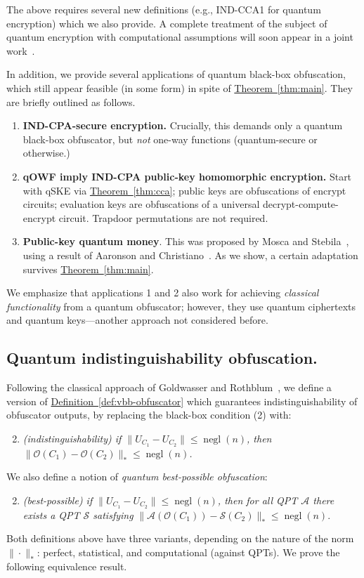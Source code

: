 \documentclass[11pt]{amsart}
\numberwithin{equation}{section}
\newcommand{\opn}{\operatorname}
\newcommand{\expref}[2]{\texorpdfstring{\hyperref[#2]{#1~\ref{#2}}}{#1~\ref{#2}}}
\newcommand{\negl}{\opn{negl}}
\begin{document}
\noindent The above requires several new definitions (e.g., IND-CCA1 for quantum encryption) which we also provide. A complete treatment of the subject of quantum encryption with computational assumptions will soon appear in a joint work~\cite{ABFGSS15}.

In addition, we provide several applications of quantum black-box obfuscation, which still appear feasible (in some form) in spite of \expref{Theorem}{thm:main}. They are briefly outlined as follows.
\begin{enumerate}
\item \textbf{IND-CPA-secure encryption.} Crucially, this demands only a quantum black-box obfuscator, but \emph{not} one-way functions (quantum-secure or otherwise.)
\item \textbf{qOWF imply IND-CPA public-key homomorphic encryption.} Start with qSKE via \expref{Theorem}{thm:cca}; public keys are obfuscations of encrypt circuits; evaluation keys are obfuscations of a universal decrypt-compute-encrypt circuit. Trapdoor permutations are not required.
\item \textbf{Public-key quantum money}. This was proposed by Mosca and Stebila~\cite{MS10}, using a result of Aaronson and Christiano~\cite{Aar09, AC12}. As we show, a certain adaptation survives \expref{Theorem}{thm:main}.
\end{enumerate}
\noindent We emphasize that applications 1 and 2 also work for achieving \emph{classical functionality} from a quantum obfuscator; however, they use quantum ciphertexts and quantum keys---another approach not considered before.

\subsection{Quantum indistinguishability obfuscation.}

Following the classical approach of Goldwasser and Rothblum~\cite{GR07}, we define a version of \expref{Definition}{def:vbb-obfuscator} which guarantees indistinguishability of obfuscator outputs, by replacing the black-box condition (2) with:
\begin{enumerate}
\setcounter{enumi}{1}
\item \emph{(indistinguishability) if $\|U_{C_1} - U_{C_2}\| \leq \negl(n)$, then $\|\mathcal O(C_1) - \mathcal O(C_2)\|_{*} \leq \negl(n)$.}
\end{enumerate}
We also define a notion of \emph{quantum best-possible obfuscation}:
\begin{enumerate}
\setcounter{enumi}{1}
\item \emph{(best-possible) if $\|U_{C_1} - U_{C_2}\| \leq \negl(n)$, then for all QPT $\mathcal A$ there exists a QPT $\mathcal S$ satisfying}
$\| \mathcal A(\mathcal O(C_1)) - \mathcal S(C_2) \|_{*} \leq \negl(n)$.
\end{enumerate}
\noindent Both definitions above have three variants, depending on the nature of the norm $\| \cdot \|_{*}$: perfect, statistical, and computational (against QPTs). We prove the following equivalence result.
\end{document}
